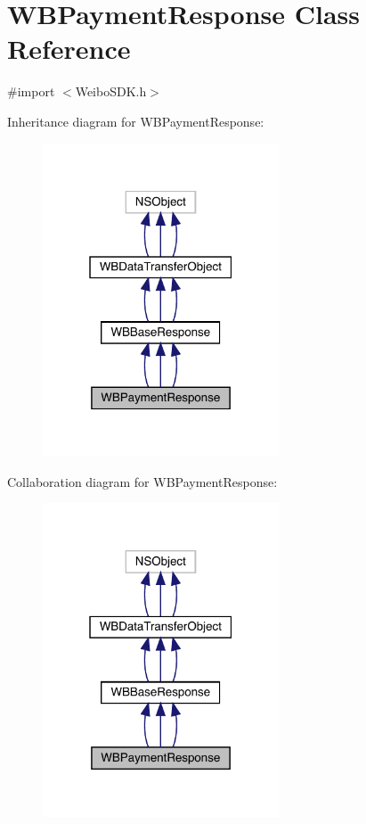 \hypertarget{interface_w_b_payment_response}{}\section{W\+B\+Payment\+Response Class Reference}
\label{interface_w_b_payment_response}


{\ttfamily \#import $<$Weibo\+S\+D\+K.\+h$>$}



Inheritance diagram for W\+B\+Payment\+Response\+:\nopagebreak
\begin{figure}[H]
\begin{center}
\leavevmode
\includegraphics[width=199pt]{interface_w_b_payment_response__inherit__graph}
\end{center}
\end{figure}


Collaboration diagram for W\+B\+Payment\+Response\+:\nopagebreak
\begin{figure}[H]
\begin{center}
\leavevmode
\includegraphics[width=199pt]{interface_w_b_payment_response__coll__graph}
\end{center}
\end{figure}
